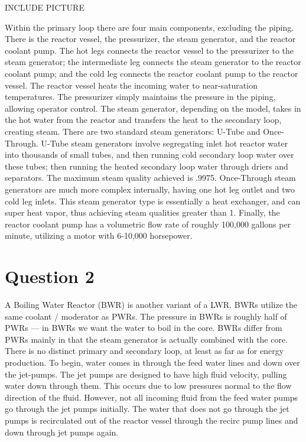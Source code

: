 \documentclass{article}
\begin{document}
INCLUDE PICTURE

Within the primary loop there are four main components, excluding the piping. There is the reactor vessel, the pressurizer, the steam generator, and the reactor coolant pump. The hot legs connects the reactor vessel to the pressurizer to the steam generator; the intermediate leg connects the steam generator to the reactor coolant pump; and the cold leg connects the reactor coolant pump to the reactor vessel. The reactor vessel heats the incoming water to near-saturation temperatures. The pressurizer simply maintains the pressure in the piping, allowing operator control. The steam generator, depending on the model, takes in the hot water from the reactor and transfers the heat to the secondary loop, creating steam. There are two standard steam generators: U-Tube and Once-Through. U-Tube steam generators involve segregating inlet hot reactor water into thousands of small tubes, and then running cold secondary loop water over these tubes; then running the heated secondary loop water through driers and separators. The maximum steam quality achieved is .9975. Once-Through steam generators are much more complex internally, having one hot leg outlet and two cold leg inlets. This steam generator type is essentially a heat exchanger, and can super heat vapor, thus achieving steam qualities greater than 1. Finally, the reactor coolant pump has a volumetric flow rate of roughly 100,000 gallons per minute, utilizing a motor with 6-10,000 horsepower. 


\newpage
\section*{Question 2}

A Boiling Water Reactor (BWR) is another variant of a LWR. BWRs utilize the same coolant / moderator as PWRs. The pressure in BWRs is roughly half of PWRs --- in BWRs we want the water to boil in the core. BWRs differ from PWRs mainly in that the steam generator is actually combined with the core. There is no distinct primary and secondary loop, at least as far as for energy production. To begin, water comes in through the feed water lines and down over the jet-pumps. The jet pumps are designed to have high fluid velocity, pulling water down through them. This occurs due to low pressures normal to the flow direction of the fluid. However, not all incoming fluid from the feed water pumps go through the jet pumps initially. The water that does not go through the jet pumps is recirculated out of the reactor vessel through the recirc pump lines and down through jet pumps again. 
\end{document}
